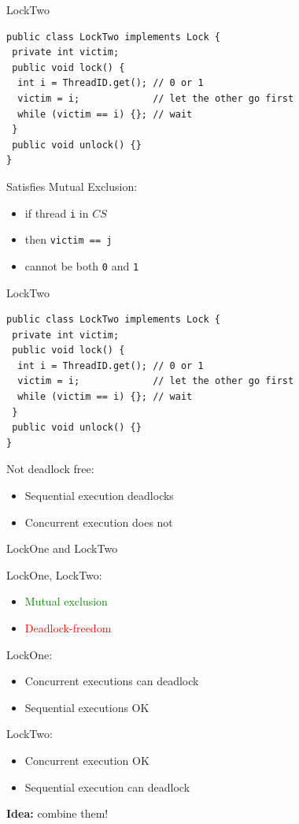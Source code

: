 \begin{frame}[fragile]{LockTwo}

\begin{verbatim}
public class LockTwo implements Lock {
 private int victim;
 public void lock() {
  int i = ThreadID.get(); // 0 or 1
  victim = i;             // let the other go first
  while (victim == i) {}; // wait 
 }
 public void unlock() {}
}
\end{verbatim}

\pause
Satisfies Mutual Exclusion:
\begin{itemize}
  \item if thread \texttt{i} in $CS$
  \item then \texttt{victim == j}
  \item cannot be both \texttt{0} and \texttt{1}
\end{itemize}

\end{frame}


\begin{frame}[fragile]{LockTwo}

\begin{verbatim}
public class LockTwo implements Lock {
 private int victim;
 public void lock() {
  int i = ThreadID.get(); // 0 or 1
  victim = i;             // let the other go first
  while (victim == i) {}; // wait 
 }
 public void unlock() {}
}
\end{verbatim}

\pause

Not deadlock free:
\begin{itemize}
  \item Sequential execution deadlocks
  \item Concurrent execution does not
\end{itemize}
\end{frame}


\begin{frame}[fragile]{LockOne and LockTwo}

LockOne, LockTwo:
\begin{itemize}
  \item \textcolor{green}{Mutual exclusion}
  \item \textcolor{red}{Deadlock-freedom}
\end{itemize}

\pause

LockOne:
\begin{itemize}
  \item Concurrent executions can deadlock
  \item Sequential executions OK
\end{itemize}

\pause

LockTwo:
\begin{itemize}
  \item Concurrent execution OK
  \item Sequential execution can deadlock
\end{itemize}

\pause

\textbf{Idea:} combine them!
\end{frame}

